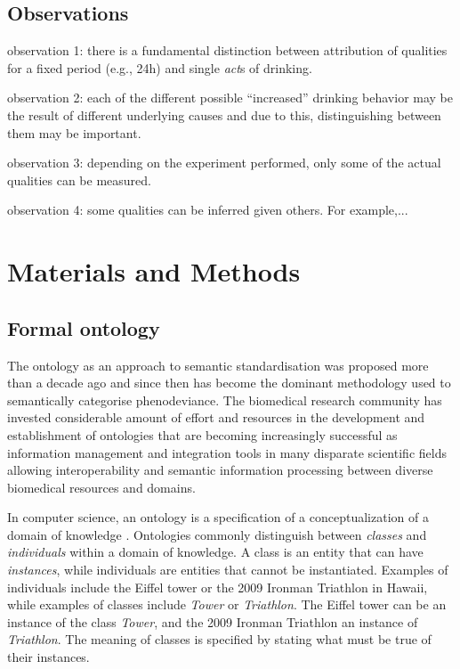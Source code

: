 \documentclass{bioinfo}
\renewcommand{\cite}{\citep}
\begin{document}
\subsection{Observations}
observation 1: there is a fundamental distinction between attribution
of qualities for a fixed period (e.g., 24h) and single {\em act}s of
drinking.

observation 2: each of the different possible ``increased'' drinking
behavior may be the result of different underlying causes and due to
this, distinguishing between them may be important.

observation 3: depending on the experiment performed, only some of the
actual qualities can be measured.

observation 4: some qualities can be inferred given others. For
example,...

\section{Materials and Methods}
\subsection{Formal ontology}
The ontology as an approach to semantic standardisation was proposed
more than a decade ago and since then has become the dominant
methodology used to semantically categorise phenodeviance.  The
biomedical research community has invested considerable amount of
effort and resources in the development and establishment of
ontologies that are becoming increasingly successful as information
management and integration tools in many disparate scientific fields
allowing interoperability and semantic information processing between
diverse biomedical resources and domains.

In computer science, an ontology is a specification of a
conceptualization of a domain of knowledge \cite{Gruber1995,
  Guarino1998}.  Ontologies commonly distinguish between {\em classes}
and {\em individuals} within a domain of knowledge. A class is an
entity that can have {\em instances}, while individuals are entities
that cannot be instantiated. Examples of individuals include the
Eiffel tower or the 2009 Ironman Triathlon in Hawaii, while examples
of classes include {\em Tower} or {\em Triathlon}. The Eiffel tower
can be an instance of the class {\em Tower}, and the 2009 Ironman
Triathlon an instance of {\em Triathlon}.  The meaning of classes is
specified by stating what must be true of their instances.
\end{document}
